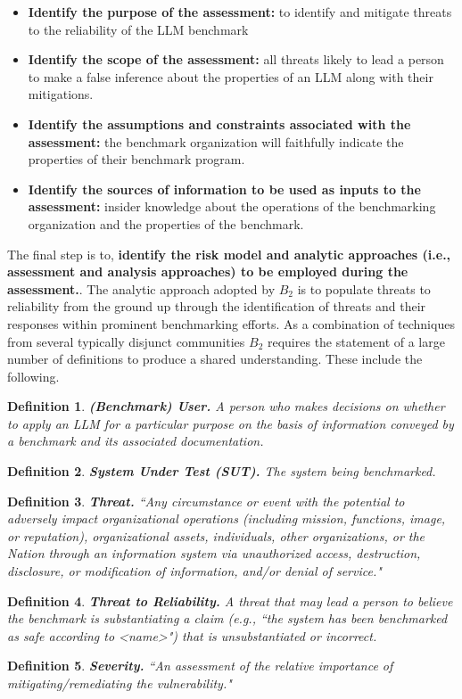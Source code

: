 \documentclass{article}
\newtheorem{dfn}{Definition}[section]
\newcommand\bb{$B_2$ }
\begin{document}
\begin{itemize}
    \item {\bf Identify the purpose of the assessment:} to identify and mitigate threats to the reliability of the LLM benchmark
    \item {\bf Identify the scope of the assessment:} all threats likely to lead a person to make a false inference about the properties of an LLM along with their mitigations.
    \item {\bf Identify the assumptions and constraints associated with the assessment:} the benchmark organization will faithfully indicate the properties of their benchmark program.
    \item {\bf Identify the sources of information to be used as inputs to the assessment:} insider knowledge about the operations of the benchmarking organization and the properties of the benchmark.
\end{itemize}

The final step is to, {\bf identify the risk model and analytic approaches (i.e., assessment and analysis approaches) to be employed during the assessment.}. The analytic approach adopted by \bb is to populate threats to reliability from the ground up through the identification of threats and their responses within prominent benchmarking efforts. As a combination of techniques from several typically disjunct communities \bb requires the statement of a large number of definitions to produce a shared understanding. These include the following.

\begin{dfn}
{\bf (Benchmark) User.} A person who makes decisions on whether to apply an LLM for a particular purpose on the basis of information conveyed by a benchmark and its associated documentation.
\end{dfn}
\begin{dfn}
{\bf System Under Test (SUT).} The system being benchmarked.
\end{dfn}
\begin{dfn}
{\bf Threat.} ``Any circumstance or event with the potential to adversely impact organizational operations (including mission, functions, image, or reputation), organizational assets, individuals, other organizations, or the Nation through an information system via unauthorized access, destruction, disclosure, or modification of information, and/or denial of service." \cite{cnssi4009}\\
\end{dfn}
\begin{dfn}
{\bf Threat to Reliability.} A threat that may lead a person to believe the benchmark is substantiating a claim (e.g., ``the system has been benchmarked as safe according to <name>") that is unsubstantiated or incorrect.
\end{dfn}
\begin{dfn}
{\bf Severity.} ``An assessment of the relative importance of mitigating/remediating the vulnerability." \cite{nist80030r1}
\end{dfn}
\end{document}
